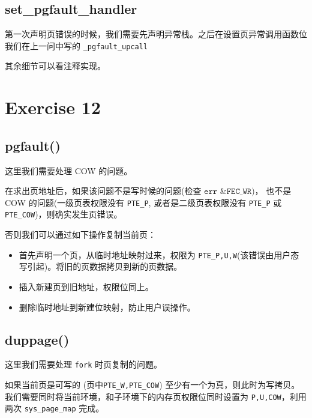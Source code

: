 \documentclass[11pt]{article}
\begin{document}
	\subsection*{set\_pgfault\_handler}
		
		\par 第一次声明页错误的时候，我们需要先声明异常栈。之后在设置页异常调用函数位我们在上一问中写的 \texttt{\_pgfault\_upcall}
		
		\par 其余细节可以看注释实现。
		
	\section{Exercise 12}
	
	\subsection*{pgfault()}
	
	\par 这里我们需要处理 COW 的问题。
	
	\par 在求出页地址后，如果该问题不是写时候的问题(检查 $\texttt{err \& FEC\_WR})$， 也不是 COW 的问题(一级页表权限没有 \texttt{PTE\_P}, 或者是二级页表权限没有 \texttt{PTE\_P} 或 \texttt{PTE\_COW})，则确实发生页错误。
	
	否则我们可以通过如下操作复制当前页：
	
	\begin{itemize}
		\item 首先声明一个页，从临时地址映射过来，权限为 \texttt{PTE\_P,U,W}(该错误由用户态写引起)。将旧的页数据拷贝到新的页数据。
		
		\item 插入新建页到旧地址，权限位同上。
		
		\item 删除临时地址到新建位映射，防止用户误操作。
	\end{itemize}
	
	\subsection*{duppage()}
	
	\par 这里我们需要处理 \texttt{fork} 时页复制的问题。
	
	\par 如果当前页是可写的 (页中\texttt{PTE\_W,PTE\_COW}) 至少有一个为真，则此时为写拷贝。我们需要同时将当前环境，和子环境下的内存页权限位同时设置为 \texttt{P,U,COW}，利用两次 \texttt{sys\_page\_map} 完成。
	
\end{document}
